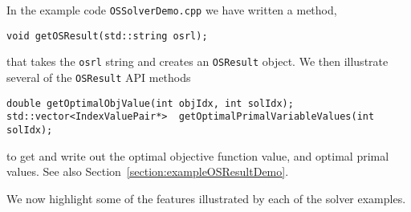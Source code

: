 \documentclass[11pt]{article}
\renewcommand{\{}{{\char"7B}}
\renewcommand{\}}{{\char"7D}}
\renewcommand{\^}{{\char"0D}}
\renewcommand{\'}{{\char"0D}}
\begin{document}
\begin{itemize}
In the example code {\tt OSSolverDemo.cpp} we have written a method,  

\begin{verbatim}
void getOSResult(std::string osrl);
\end{verbatim}

that takes the {\tt osrl} string and creates an {\tt OSResult} object.   
We then illustrate several of the {\tt OSResult} API methods 

\begin{verbatim}
double getOptimalObjValue(int objIdx, int solIdx);
std::vector<IndexValuePair*>  getOptimalPrimalVariableValues(int solIdx);
\end{verbatim}
to get and write out the optimal objective function value, and optimal primal values.  
See also Section~\ref{section:exampleOSResultDemo}.

\end{itemize}

We now highlight some of the features illustrated by each of the solver examples.
\end{document}
